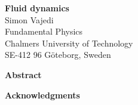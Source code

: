 \documentclass[a4paper,12pt,twoside,openright]{UGthesis}
\newcommand\ffam{\sffamily}
\newcommand\fser{\bfseries}
\newcommand\fsh{\upshape}
\newcommand\blankpage{\thispagestyle{empty}\mbox{}\newpage}
\newcommand{\titel}{Fluid dynamics}
\begin{document}
%
%

\mbox{}\thispagestyle{empty}\newpage
\vspace*{165mm}


\blankpage

%
%

\thispagestyle{empty}
\begin{center}
        {\ffam 
        {\fser\Large \titel}\\
\vspace{3mm}
        {\normalsize Simon Vajedi  \\
        Fundamental Physics \\
        Chalmers University of Technology\\
        SE-412 96 Göteborg, Sweden} \\[7mm]}
\end{center}

\centerline{\ffam\fser Abstract}
\medskip
\normalsize
\noindent

\vfill

\newpage

%
%
\thispagestyle{plain}
\vspace*{4cm}

\centerline{\ffam\fser\Large Acknowledgments}
\medskip
\smallskip

\normalsize
\noindent 

%
%
\cleardoublepage
\tableofcontents
\pagestyle{empty}

\cleardoublepage
\pagestyle{fancy}
\renewcommand{\chaptermark}[1]{\markboth{Chapter \thechapter\ \ \ #1}{#1}}
\renewcommand{\sectionmark}[1]{\markright{\thesection\ \ #1}}
\lhead[\fancyplain{}{\sffamily\thepage}]%
  {\fancyplain{}{\sffamily\rightmark}}
\rhead[\fancyplain{}{\sffamily\leftmark}]%
  {\fancyplain{}{\sffamily\thepage}}
\cfoot{}
\setlength\headheight{14pt}
\end{document}
